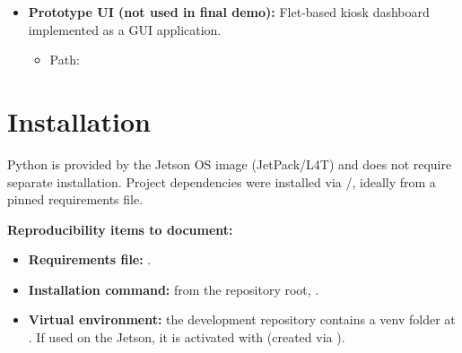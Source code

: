 \begin{itemize}
\begin{itemize}
		{\sloppy\small
			\begin{itemize}
				\item Application path: 
				\item Endpoints:
				\begin{itemize}
					\item \texttt{/} — Web UI
					\item \texttt{/video\_feed} — MJPEG video stream
					\item \texttt{/api/billing} — JSON billing API
				\end{itemize}
			\end{itemize}
		}
		
		\item \textbf{Prototype UI (not used in final demo):}  
		Flet-based kiosk dashboard implemented as a GUI application.
		
		{\sloppy\small
			\begin{itemize}
				\item Path: 
			\end{itemize}
		}
	\end{itemize}
\end{itemize}

\section{Installation}
\noindent
Python is provided by the Jetson OS image (JetPack/L4T) and does not require separate installation.
Project dependencies were installed via /, ideally from a pinned requirements file.

\vspace{1mm}
\noindent
\textbf{Reproducibility items to document:}
\begin{itemize}
	\item \textbf{Requirements file:} .
	\item \textbf{Installation command:} from the repository root, .
	\item \textbf{Virtual environment:} the development repository contains a venv folder at . If used on the Jetson, it is activated with  (created via ).
\end{itemize}


